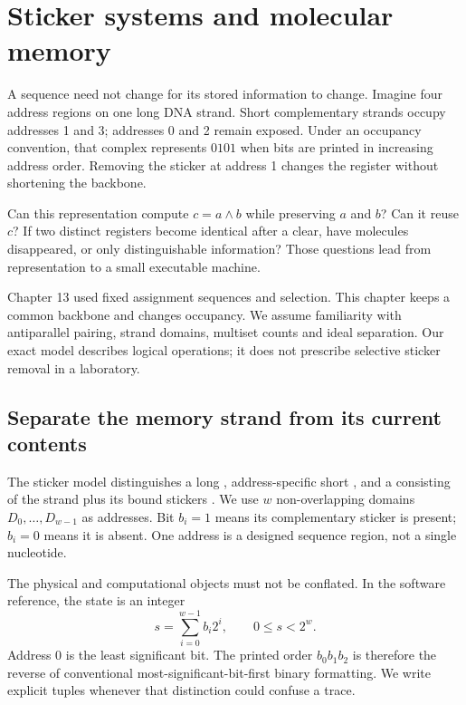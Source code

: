 \chapter{Sticker systems and molecular memory}
A sequence need not change for its stored information to change. Imagine
four address regions on one long DNA strand. Short complementary strands
occupy addresses 1 and 3; addresses 0 and 2 remain exposed. Under an
occupancy convention, that complex represents $0101$ when bits are printed
in increasing address order. Removing the sticker at address 1 changes the
register without shortening the backbone.

Can this representation compute $c=a\land b$ while preserving $a$ and $b$?
Can it reuse $c$? If two distinct registers become identical after a clear,
have molecules disappeared, or only distinguishable information?
Those questions lead from representation to a small executable machine.

Chapter 13 used fixed assignment sequences and selection. This chapter
keeps a common backbone and changes occupancy. We assume familiarity with
antiparallel pairing, strand domains, multiset counts and ideal separation.
Our exact model describes logical operations; it does not prescribe
selective sticker removal in a laboratory.

\section{Separate the memory strand from its current contents}
The sticker model distinguishes a long , address-specific
short , and a  consisting of the strand
plus its bound stickers \cite{stickers}. We use $w$ non-overlapping domains
$D_0,\ldots,D_{w-1}$ as addresses. Bit $b_i=1$ means its complementary
sticker is present; $b_i=0$ means it is absent. One address is a designed
sequence region, not a single nucleotide.


The physical and computational objects must not be conflated. In the
software reference, the state is an integer
\begin{equation}
 s=\sum_{i=0}^{w-1}b_i2^i,\qquad 0\leq s<2^w.
 \label{eq:register}
\end{equation}
Address 0 is the least significant bit. The printed order $b_0b_1b_2$
is therefore the reverse of conventional most-significant-bit-first
binary formatting. We write explicit tuples whenever that distinction
could confuse a trace.

